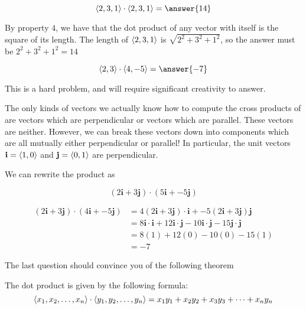 \documentclass{ximera}
\begin{document}
\begin{question}
\[
\vector{2,3,1}\cdot\vector{2,3,1}= \answer{14} 
\]	

\begin{hint}
	By property $4$, we have that the dot product of any vector with itself is the square of its length.  The length of $\left\langle 2,3,1\right\rangle$ is $\sqrt{2^2+3^2+1^2}$, so the answer must be $2^2+3^2+1^2  =14$
\end{hint}
\end{question}

\begin{question}
\[
\vector{2,3}  \cdot \vector{4,-5}= \answer{-7} 
\]

This is a hard problem, and will require significant creativity to answer.

\begin{hint}
	The only kinds of vectors we actually know how to compute the cross products of are vectors which are perpendicular or vectors which are parallel.  These vectors are neither.  However, we can break these vectors down into components which are all mutually either perpendicular or parallel!  In particular, the unit vectors $\mathbf{i} = \left\langle 1,0\right\rangle$ and $\mathbf{j} = \left\langle 0,1\right\rangle$ are perpendicular. 
\end{hint}

\begin{hint}
	We can rewrite the product as
	
	\[
	(2\mathbf{i}+3\mathbf{j}) \cdot (5\mathbf{i} +-5\mathbf{j})
	\]
\end{hint}

\begin{hint}
	\begin{align*}
		(2\mathbf{i}+3\mathbf{j}) \cdot (4\mathbf{i} +-5\mathbf{j}) &= 4(2\mathbf{i}+3\mathbf{j}) \cdot \mathbf{i}+ -5(2\mathbf{i}+3\mathbf{j}) \mathbf{j}\\
			&=8\mathbf{i} \cdot \mathbf{i} +12 \mathbf{i} \cdot \mathbf{j}-10\mathbf{i} \cdot \mathbf{j}-15\mathbf{j} \cdot \mathbf{j}\\
			&=8(1)+12(0)-10(0)-15(1)\\
			&=-7
	\end{align*}
\end{hint}
\end{question}

The last question should convince you of the following theorem

\begin{theorem}
	The dot product is given by the following formula:
	\[
	\left\langle x_1,x_2, \dots,x_n\right\rangle \cdot \left\langle y_1,y_2, \dots,y_n\right\rangle  =x_1y_1+x_2y_2+x_3y_3+\dots + x_ny_n
	\]
\end{theorem}
\end{document}
